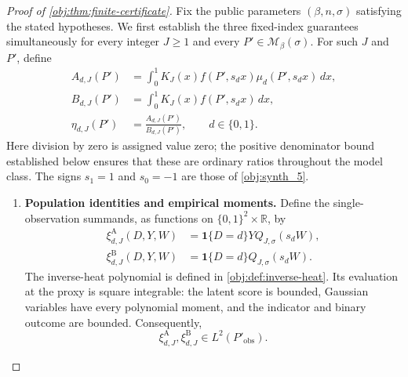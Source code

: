 \begin{proof}[Proof of \cref{obj:thm:finite-certificate}]
Fix the public parameters \((\beta,n,\sigma)\) satisfying the stated hypotheses. We first establish the three fixed-index guarantees simultaneously for every integer \(J\ge1\) and every \(P'\in\mathcal M_\beta(\sigma)\). For such \(J\) and \(P'\), define
\[
\begin{aligned}
A_{d,J}(P')
&=\int_0^1 K_J(x)f(P',s_dx)\mu_d(P',s_dx)\,dx,\\
B_{d,J}(P')
&=\int_0^1 K_J(x)f(P',s_dx)\,dx,\\
\eta_{d,J}(P')
&=\frac{A_{d,J}(P')}{B_{d,J}(P')},
\qquad d\in\{0,1\}.
\end{aligned}
\]
Here division by zero is assigned value zero; the positive denominator bound established below ensures that these are ordinary ratios throughout the model class. The signs \(s_1=1\) and \(s_0=-1\) are those of \cref{obj:synth_5}.

\begin{enumerate}
\item \textbf{Population identities and empirical moments.}
Define the single-observation summands, as functions on
\(\{0,1\}^2\times\mathbb R\), by
\[
\begin{aligned}
\xi^{\mathrm A}_{d,J}(D,Y,W)
&=\mathbf1\{D=d\}YQ_{J,\sigma}(s_dW),\\
\xi^{\mathrm B}_{d,J}(D,Y,W)
&=\mathbf1\{D=d\}Q_{J,\sigma}(s_dW).
\end{aligned}
\]
The inverse-heat polynomial is defined in \cref{obj:def:inverse-heat}.
Its evaluation at the proxy is square integrable: the latent score is bounded, Gaussian variables have every polynomial moment, and the indicator and binary outcome are bounded. Consequently,
\[
\xi^{\mathrm A}_{d,J},\xi^{\mathrm B}_{d,J}
\in L^2(P'_{\mathrm{obs}}).
\]


\end{enumerate}
\end{proof}
